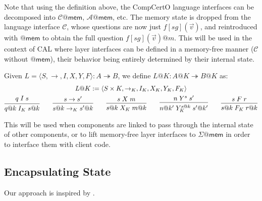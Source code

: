 \documentclass[acmsmall,screen,review,anonymous]{acmart}
\newcommand{\kw}[1]{\ensuremath{ \mathsf{#1} }}
\begin{document}
Note that using the definition above,
the CompCertO language interfaces
can be decomposed into $\mathcal{C}@\kw{mem}$, $\mathcal{A}@\kw{mem}$, etc.
The memory state is dropped from the language interface $\mathcal{C}$,
whose questions are now just $f[\mathit{sg}](\vec{v})$,
and reintroduced with $@\kw{mem}$ to obtain
the full question $f[\mathit{sg}](\vec{v})@m$.
This will be used in the context of CAL
where layer interfaces can be defined in a memory-free manner
($\mathcal{C}$ without $@\kw{mem}$),
their behavior being entirely determined by their internal state.

\begin{definition}[Lifting]
Given %
$L = \langle S, {\rightarrow}, I, X, Y, F \rangle : A \twoheadrightarrow B$,
we define $L@K : A@K \twoheadrightarrow B@K$ as:
\begin{gather*}
  L@K := \langle S \times K, {\rightarrow_K}, I_K, X_K, Y_K, F_K \rangle \\
 {\begin{prooftree}
    \hypo{q \mathrel{I} s}
    \infer1{q@k \mathrel{I_K} s@k}
  \end{prooftree}}
  \qquad
 {\begin{prooftree}
    \hypo{s \rightarrow s'}
    \infer1{s@k \rightarrow_K s'@k}
  \end{prooftree}}
  \qquad
 {\begin{prooftree}
    \hypo{s \mathrel{X} m}
    \infer1{s@k \mathrel{X_K} m@k}
  \end{prooftree}}
  \qquad
 {\begin{prooftree}
    \hypo{n \mathrel{Y}^s s'}
    \infer1{n@k' \mathrel{Y^{s@k}_K} s'@k'}
  \end{prooftree}}
  \qquad
 {\begin{prooftree}
    \hypo{s \mathrel{F} r}
    \infer1{s@k \mathrel{F_K} r@k}
  \end{prooftree}}
\end{gather*}
\end{definition}

This will be used when components are linked
to pass through the internal state of other components,
or to lift memory-free layer interfaces to $\Sigma@\kw{mem}$
in order to interface them with client code.

\subsection{Encapsulating State}

Our approach is inspired by \citet{feedback,caots}.
\end{document}
